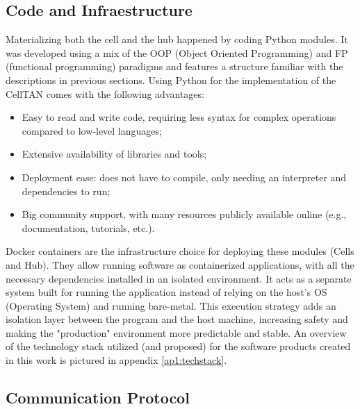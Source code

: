 \subsection{Code and Infraestructure}

Materializing both the cell and the hub happened by coding Python modules. It was developed using a mix of the OOP (Object Oriented Programming) and FP (functional programming) paradigms and features a structure familiar with the descriptions in previous sections. Using Python for the implementation of the CellTAN comes with the following advantages:

\begin{itemize}
    \item Easy to read and write code, requiring less syntax for complex operations compared to low-level languages;
    \item Extensive availability of libraries and tools;
    \item Deployment ease: does not have to compile, only needing an interpreter and dependencies to run;
    \item Big community support, with many resources publicly available online (e.g., documentation, tutorials, etc.). 
\end{itemize}


Docker containers \cite{docker} are the infrastructure choice for deploying these modules (Cells and Hub). They allow running software as containerized applications, with all the necessary dependencies installed in an isolated environment. It acts as a separate system built for running the application instead of relying on the host's OS (Operating System) and running bare-metal. This execution strategy adds an isolation layer between the program and the host machine, increasing safety and making the "production" environment more predictable and stable. An overview of the technology stack utilized (and proposed) for the software products created in this work is pictured in appendix \ref{ap1:techstack}.



\subsection{Communication Protocol}

